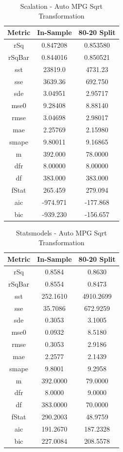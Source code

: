 \documentclass{article}
\begin{document}
\begin{table}[H]
\centering
\caption{Scalation - Auto MPG Sqrt Transformation}
\label{tab:Scalation - Auto MPG Sqrt Transformation}
\begin{tabular}{|c|c|c|} \hline 
Metric & In-Sample & 80-20 Split \\ \hline \hline 
rSq &0.847208 & 0.853580 \\ \hline 
rSqBar &0.844016 &      0.850521 \\ \hline 
sst &23819.0 &  4731.23 \\ \hline 
sse &3639.36 &  692.750 \\ \hline 
sde &3.04951 &  2.95717 \\ \hline 
mse0 &9.28408 & 8.88140 \\ \hline 
rmse &3.04698 & 2.98017 \\ \hline 
mae &2.25769 &  2.15980 \\ \hline 
smape &9.80011 &        9.16865 \\ \hline 
m &392.000 &    78.0000 \\ \hline 
dfr &8.00000 &  8.00000 \\ \hline 
df &383.000 &   383.000 \\ \hline 
fStat &265.459 &        279.094 \\ \hline 
aic &-974.971 & -177.868 \\ \hline 
bic &-939.230 & -156.657 \\ \hline 
\end{tabular}
\end{table}

\begin{table}[H]
\centering
\caption{Statsmodels - Auto MPG Sqrt Transformation}
\label{tab:Statsmodels - Auto MPG Sqrt Transformation}
\begin{tabular}{|c|c|c|}\hline
Metric & In-Sample & 80-20 Split \\ \hline \hline
rSq & 0.8584 & 0.8630 \\ \hline
rSqBar & 0.8554 & 0.8473 \\ \hline
sst & 252.1610 & 4910.2699 \\ \hline
sse & 35.7086 & 672.9259 \\ \hline
sde & 0.3053 & 3.1005 \\ \hline
mse0 & 0.0932 & 8.5180 \\ \hline
rmse & 0.3053 & 2.9186 \\ \hline
mae & 2.2577 & 2.1439 \\ \hline
smape & 9.8001 & 9.2958 \\ \hline
m & 392.0000 & 79.0000 \\ \hline
dfr & 8.0000 & 9.0000 \\ \hline
df & 383.0000 & 70.0000 \\ \hline
fStat & 290.2003 & 48.9759 \\ \hline
aic & 191.2670 & 187.2328 \\ \hline
bic & 227.0084 & 208.5578 \\ \hline
\end{tabular}
\end{table}
\end{document}
